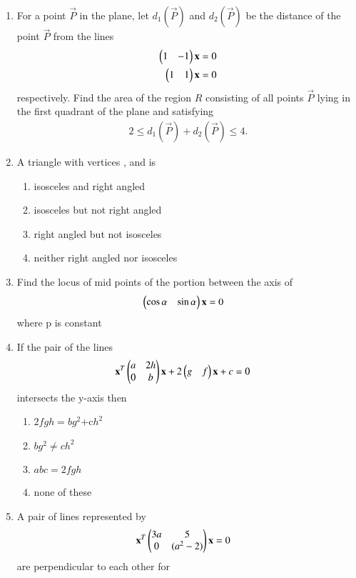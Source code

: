 \begin{enumerate}[label=\arabic*.,ref=\thesubsection.\theenumi]
\item For a point $\vec{P}$ in the plane, let $d_1(\vec{P})$ and $d_2(\vec{P})$ be the distance of the point $\vec{P}$ from the lines 
\begin{align} 
\begin{pmatrix}1 & -1\end{pmatrix} \mathbf {x} &=0
\\
\begin{pmatrix}1 & 1\end{pmatrix} \mathbf {x} &=0
\end{align} 
respectively. 
Find the area of the region $R$ consisting of all points $\vec{P}$ lying in the first quadrant of the plane and satisfying 
\begin{align} 
2\leq d_1(\vec{P})+d_2(\vec{P}) \leq 4.
\end{align} 
    \item A triangle with vertices , and  is
    \begin{enumerate}
     \item  isosceles and right angled
     \item  isosceles but not right angled
     \item  right angled but not isosceles
     \item  neither right angled nor isosceles
     \end{enumerate}
    \item Find the locus of mid points of the portion between the axis of 
\begin{align}\begin{pmatrix}\cos\alpha & \sin\alpha\end{pmatrix}\mathbf {x} &= 0\end{align} 
where p is constant
    \item If the pair of the lines \begin{align} \mathbf{x}^T\begin{pmatrix}a & 2h \\ 0 & b\end{pmatrix} \mathbf {x} + 2\begin{pmatrix}g & f\end{pmatrix}\mathbf {x} + c &=0\end{align}  intersects the y-axis then
    \begin{enumerate}
     \item  $2fgh=bg^2$+c$h^2$
     \item  $bg^2\neq c h^2$
     \item  $abc=2fgh$
     \item  none of these
     \end{enumerate}
    \item A pair of lines represented by \begin{align} \mathbf{x}^T\begin{pmatrix}3a & 5 \\ 0 & (a^2-2)\end{pmatrix} \mathbf {x} &=0\end{align} are perpendicular to each other for

\end{enumerate}
